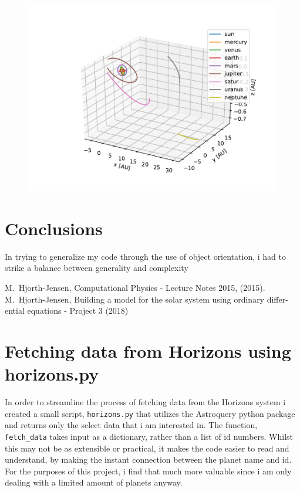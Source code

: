 \documentclass[10pt,showpacs,preprintnumbers,footinbib,amsmath,amssymb,aps,prl,twocolumn,groupedaddress,superscriptaddress,showkeys]{revtex4-1}
\begin{document}
\begin{figure}[h!tb]
  \center
  \includegraphics{figs/all_planets3d.pdf}
\end{figure}




\section{Conclusions}
  In trying to generalize my code through the use of object orientation, i had to strike a balance between generality and complexity

\begin{thebibliography}{99}
 M.~Hjorth-Jensen, Computational Physics - Lecture Notes 2015, (2015).
 M.~Hjorth-Jensen, Building a model for the solar system using ordinary differ-
ential equations - Project 3 (2018)
\end{thebibliography}

\appendix
\section{Fetching data from Horizons using horizons.py}
  In order to streamline the process of fetching data from the Horizons system i created a small script, \lstinline{horizons.py} that utilizes the Astroquery python package and returns only the select data that i am interested in. The function, \lstinline{fetch_data} takes input as a dictionary, rather than a list of id numbers. Whilst this may not be as extensible or practical, it makes the code easier to read and understand, by making the instant connection between the planet name and id. For the purposes of this project, i find that much more valuable since i am only dealing with a limited amount of planets anyway.
\end{document}
